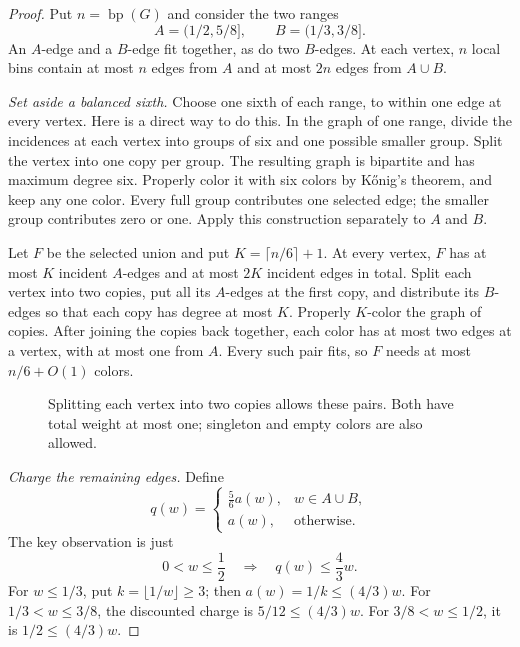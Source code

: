 \documentclass[11pt]{article}
\theoremstyle{definition}\newtheorem{algorithm}{Algorithm}[section]
\numberwithin{equation}{section}
\theoremstyle{remark}\newtheorem*{remark}{Remark}
\newcommand{\bp}{\operatorname{bp}}
\begin{document}
\begin{proof}
Put $n=\bp(G)$ and consider the two ranges
\[
 A=(1/2,5/8],\qquad B=(1/3,3/8].
\]
An $A$-edge and a $B$-edge fit together, as do two $B$-edges.
At each vertex, $n$ local bins contain at most $n$ edges from $A$
and at most $2n$ edges from $A\cup B$.

\textit{Set aside a balanced sixth.}
Choose one sixth of each range, to within one edge at every vertex.
Here is a direct way to do this. In the graph of one range, divide the
incidences at each vertex into groups of six and one possible smaller
group. Split the vertex into one copy per group. The resulting graph
is bipartite and has maximum degree six. Properly color it with six
colors by K\H{o}nig's theorem, and keep any one color. Every full group
contributes one selected edge; the smaller group contributes zero or
one. Apply this construction separately to $A$ and $B$.

Let $F$ be the selected union and put $K=\lceil n/6\rceil+1$.
At every vertex, $F$ has at most $K$ incident $A$-edges and at most
$2K$ incident edges in total. Split each vertex into two copies,
put all its $A$-edges at the first copy, and distribute its $B$-edges
so that each copy has degree at most $K$. Properly $K$-color the graph
of copies. After joining the copies back together, each color has at
most two edges at a vertex, with at most one from $A$. Every such pair
fits, so $F$ needs at most $n/6+O(1)$ colors.

\begin{figure}[htbp]
\centering
{}
\caption{Splitting each vertex into two copies allows these pairs.
Both have total weight at most one; singleton and empty colors are
also allowed.}
\label{fig:short-five-thirds}
\end{figure}

\textit{Charge the remaining edges.}
Define
\[
 q(w)=
 \begin{cases}
  \frac56 a(w),&w\in A\cup B,\\
  a(w),&\text{otherwise}.
 \end{cases}
\]
The key observation is just
\begin{equation}\label{eq:short-five-thirds-light}
 0<w\le\frac12\quad\Longrightarrow\quad q(w)\le\frac43w.
\end{equation}
For $w\le1/3$, put $k=\lfloor1/w\rfloor\ge3$; then
$a(w)=1/k\le(4/3)w$. For $1/3<w\le3/8$, the discounted charge is
$5/12\le(4/3)w$. For $3/8<w\le1/2$, it is $1/2\le(4/3)w$.


\end{proof}
\end{document}
